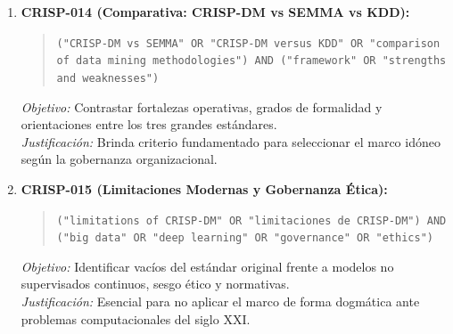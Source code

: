 \begin{enumerate}
  \begin{quote}
  \texttt{("CRISP-DM" OR "CRISP") AND ("manufacturing" OR "Industry 4.0" OR "manufactura") AND ("predictive maintenance" OR "quality control")}
  \end{quote}
  \textit{Objetivo:} Evaluar el uso de CRISP-DM para mantenimiento predictivo y control de calidad en plantas inteligentes.\\
  \textit{Justificación:} Demuestra la versatilidad de la metodología para conectar datos físicos con valor industrial.
  \item \textbf{CRISP-014 (Comparativa: CRISP-DM vs SEMMA vs KDD):}
  \begin{quote}
  \texttt{("CRISP-DM vs SEMMA" OR "CRISP-DM versus KDD" OR "comparison of data mining methodologies") AND ("framework" OR "strengths and weaknesses")}
  \end{quote}
  \textit{Objetivo:} Contrastar fortalezas operativas, grados de formalidad y orientaciones entre los tres grandes estándares.\\
  \textit{Justificación:} Brinda criterio fundamentado para seleccionar el marco idóneo según la gobernanza organizacional.
  \item \textbf{CRISP-015 (Limitaciones Modernas y Gobernanza Ética):}
  \begin{quote}
  \texttt{("limitations of CRISP-DM" OR "limitaciones de CRISP-DM") AND ("big data" OR "deep learning" OR "governance" OR "ethics")}
  \end{quote}
  \textit{Objetivo:} Identificar vacíos del estándar original frente a modelos no supervisados continuos, sesgo ético y normativas.\\
  \textit{Justificación:} Esencial para no aplicar el marco de forma dogmática ante problemas computacionales del siglo XXI.
\end{enumerate}



